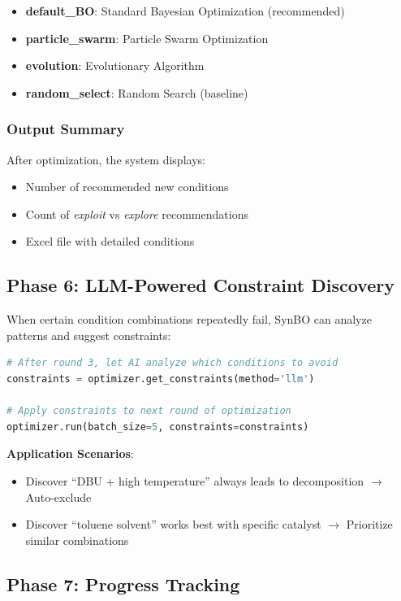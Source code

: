 \documentclass[12pt,a4paper]{article}
\begin{document}
\begin{itemize}
    \item \textbf{default\_BO}: Standard Bayesian Optimization (recommended)
    \item \textbf{particle\_swarm}: Particle Swarm Optimization
    \item \textbf{evolution}: Evolutionary Algorithm
    \item \textbf{random\_select}: Random Search (baseline)
\end{itemize}

\subsubsection{Output Summary}

After optimization, the system displays:
\begin{itemize}
    \item Number of recommended new conditions
    \item Count of \textit{exploit} vs \textit{explore} recommendations
    \item Excel file with detailed conditions
\end{itemize}

\subsection{Phase 6: LLM-Powered Constraint Discovery}

When certain condition combinations repeatedly fail, SynBO can analyze patterns and suggest constraints:

\begin{lstlisting}[language=python]
# After round 3, let AI analyze which conditions to avoid
constraints = optimizer.get_constraints(method='llm')

# Apply constraints to next round of optimization
optimizer.run(batch_size=5, constraints=constraints)
\end{lstlisting}

\textbf{Application Scenarios}:
\begin{itemize}
    \item Discover ``DBU + high temperature'' always leads to decomposition $\rightarrow$ Auto-exclude
    \item Discover ``toluene solvent'' works best with specific catalyst $\rightarrow$ Prioritize similar combinations
\end{itemize}

\subsection{Phase 7: Progress Tracking}
\end{document}
